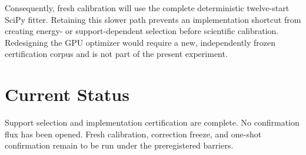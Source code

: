 \documentclass[11pt]{article}
\begin{document}
Consequently, fresh calibration will use the complete deterministic twelve-start
SciPy fitter.  Retaining this slower path prevents an implementation shortcut
from creating energy- or support-dependent selection before scientific
calibration.  Redesigning the GPU optimizer would require a new, independently
frozen certification corpus and is not part of the present experiment.

\section{Current Status}

Support selection and implementation certification are complete.  No
confirmation flux has been opened.  Fresh calibration, correction freeze, and
one-shot confirmation remain to be run under the preregistered barriers.
\end{document}
